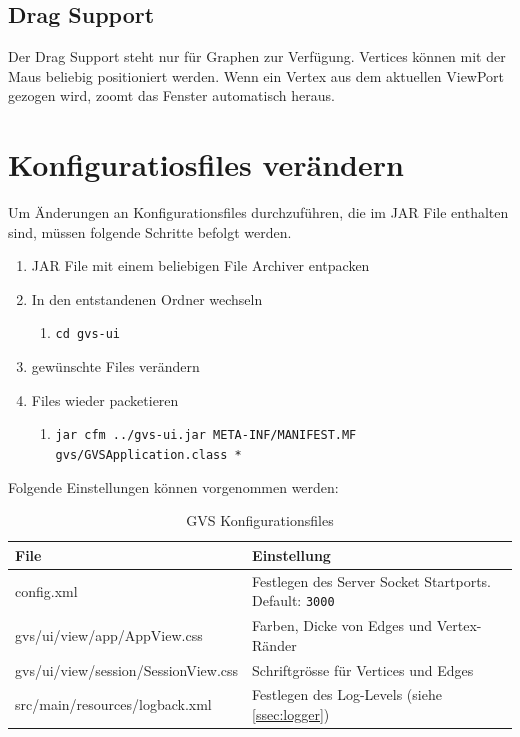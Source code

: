 \documentclass[11pt,a4paper,english,oneside]{book}
\numberwithin{equation}{chapter}
\begin{document}
	\subsection{Drag Support}
	Der Drag Support steht nur für Graphen zur Verfügung. Vertices können mit der Maus beliebig positioniert werden. Wenn ein Vertex aus dem aktuellen ViewPort gezogen wird, zoomt das Fenster automatisch heraus.
		
	\clearpage
	
	\section{Konfiguratiosfiles verändern}
	Um Änderungen an Konfigurationsfiles durchzuführen, die im JAR File enthalten sind, müssen folgende Schritte befolgt werden.
	
	\begin{enumerate}
		\item JAR File mit einem beliebigen File Archiver entpacken
		\item In den entstandenen Ordner wechseln
		\begin{enumerate}
			\item \lstinline{cd gvs-ui}
		\end{enumerate}
		\item gewünschte Files verändern
		\item Files wieder packetieren
		\begin{enumerate}
			\item \lstinline{jar cfm ../gvs-ui.jar META-INF/MANIFEST.MF gvs/GVSApplication.class *}
		\end{enumerate}
	\end{enumerate}

	Folgende Einstellungen können vorgenommen werden:
	
		\begin{table}[h!]
		\centering
		\begin{tabularx}{\linewidth}{l X}
			\toprule 
			File & Einstellung \\
			\midrule
			config.xml & Festlegen des Server Socket Startports. Default: \lstinline{3000} \\
			gvs/ui/view/app/AppView.css & Farben, Dicke von Edges und Vertex-Ränder \\
			gvs/ui/view/session/SessionView.css & Schriftgrösse für Vertices und Edges\\
			src/main/resources/logback.xml & Festlegen des Log-Levels (siehe \ref{ssec:logger})\\
			\bottomrule 
		\end{tabularx} 
		\caption{GVS Konfigurationsfiles} 
		\label{tbl:preferences}
	\end{table}
	
\end{document}
